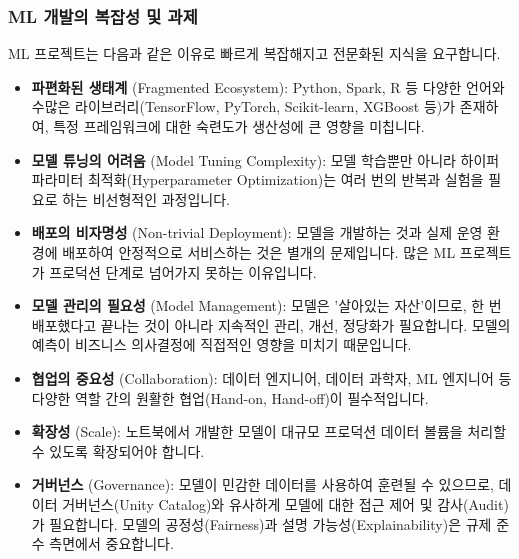\documentclass[11pt,a4paper]{article}
\theoremstyle{definition}
\begin{document}
\subsubsection*{ML 개발의 복잡성 및 과제}
ML 프로젝트는 다음과 같은 이유로 빠르게 복잡해지고 전문화된 지식을 요구합니다.
\begin{itemize}
    \item \textbf{파편화된 생태계} (Fragmented Ecosystem): Python, Spark, R 등 다양한 언어와 수많은 라이브러리(TensorFlow, PyTorch, Scikit-learn, XGBoost 등)가 존재하여, 특정 프레임워크에 대한 숙련도가 생산성에 큰 영향을 미칩니다.
    \item \textbf{모델 튜닝의 어려움} (Model Tuning Complexity): 모델 학습뿐만 아니라 하이퍼파라미터 최적화(Hyperparameter Optimization)는 여러 번의 반복과 실험을 필요로 하는 비선형적인 과정입니다.
    \item \textbf{배포의 비자명성} (Non-trivial Deployment): 모델을 개발하는 것과 실제 운영 환경에 배포하여 안정적으로 서비스하는 것은 별개의 문제입니다. 많은 ML 프로젝트가 프로덕션 단계로 넘어가지 못하는 이유입니다.
    \item \textbf{모델 관리의 필요성} (Model Management): 모델은 '살아있는 자산'이므로, 한 번 배포했다고 끝나는 것이 아니라 지속적인 관리, 개선, 정당화가 필요합니다. 모델의 예측이 비즈니스 의사결정에 직접적인 영향을 미치기 때문입니다.
    \item \textbf{협업의 중요성} (Collaboration): 데이터 엔지니어, 데이터 과학자, ML 엔지니어 등 다양한 역할 간의 원활한 협업(Hand-on, Hand-off)이 필수적입니다.
    \item \textbf{확장성} (Scale): 노트북에서 개발한 모델이 대규모 프로덕션 데이터 볼륨을 처리할 수 있도록 확장되어야 합니다.
    \item \textbf{거버넌스} (Governance): 모델이 민감한 데이터를 사용하여 훈련될 수 있으므로, 데이터 거버넌스(Unity Catalog)와 유사하게 모델에 대한 접근 제어 및 감사(Audit)가 필요합니다. 모델의 공정성(Fairness)과 설명 가능성(Explainability)은 규제 준수 측면에서 중요합니다.
\end{itemize}
\end{document}
